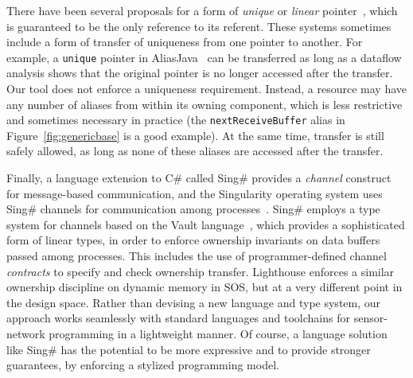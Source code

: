 There have been several proposals for a form of {\em unique}
or {\em linear}
pointer~\cite{Boyland:2001:ABU,aliasjava,Wad90:linear},
which is guaranteed to be the only reference to its referent.  These
systems sometimes include a form of transfer of uniqueness from one
pointer to another.  For example, a {\tt unique} pointer in
AliasJava~\cite{aliasjava} can be transferred as long as a dataflow
analysis shows that the original pointer is no longer accessed after
the transfer.  Our tool does not enforce a uniqueness requirement.
Instead, a resource may have any number of
aliases from within its owning component, which is less restrictive
and sometimes necessary in practice (the {\tt nextReceiveBuffer} alias
in Figure~\ref{fig:genericbase} is a good example).  
At the same time, transfer is still safely 
allowed, as long as none of these aliases are accessed after the
transfer.

Finally, a language extension to C\#
called Sing\# provides a {\em channel} construct
for message-based communication, and
the Singularity operating system uses Sing\# channels for communication among
processes~\cite{fahndrich06language}.  
Sing\#
employs a 
type system for channels based on the 
Vault language~\cite{Vault,adoption-focus}, which provides a
sophisticated form of linear types, in order to enforce ownership
invariants on data buffers passed among processes.  This includes the
use of programmer-defined channel {\em contracts} to specify and check
ownership transfer.
Lighthouse enforces a similar ownership discipline on dynamic memory
in SOS, but at a very different point in the design space.  Rather
than devising a new 
language and type system, our approach works seamlessly with
standard languages and toolchains for sensor-network programming in
a lightweight manner.  Of course, a language solution like Sing\# has
the potential to be more expressive and to provide stronger
guarantees, by enforcing a stylized programming model.


